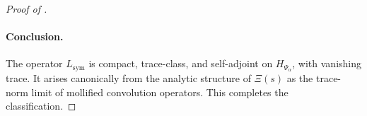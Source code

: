 \begin{proof}[Proof of ]
\paragraph{Conclusion.}
The operator \( L_{\mathrm{sym}} \) is compact, trace-class, and self-adjoint on \( H_{\Psi_\alpha} \), with vanishing trace. It arises canonically from the analytic structure of \( \Xi(s) \) as the trace-norm limit of mollified convolution operators. This completes the classification.
\end{proof}
% 